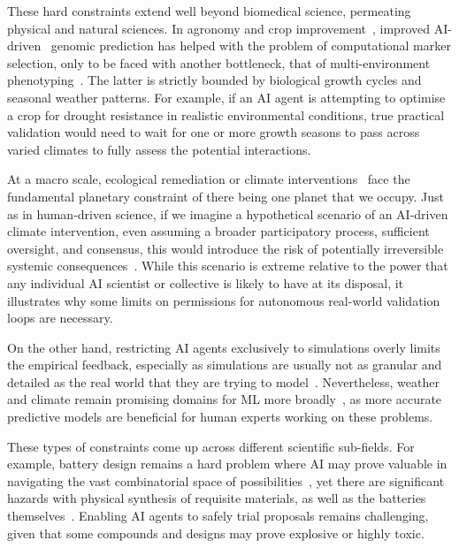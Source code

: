 \documentclass[11pt, a4paper, twocolumn, goog]{google}
\begin{document}
These hard constraints extend well beyond biomedical science, permeating physical and natural sciences. In agronomy and crop improvement~\citep{kumar2024advances}, improved AI-driven~\citep{feng2024ai, wojcik2024harnessing} genomic prediction has helped with the problem of computational marker selection, only to be faced with another bottleneck, that of multi-environment phenotyping~\citep{araus2018translating}. The latter is strictly bounded by biological growth cycles and seasonal weather patterns. For example, if an AI agent is attempting to optimise a crop for drought resistance in realistic environmental conditions, true practical validation would need to wait for one or more growth seasons to pass across varied climates to fully assess the potential interactions.

At a macro scale, ecological remediation or climate interventions~\citep{keith2013case} face the fundamental planetary constraint of there being one planet that we occupy. Just as in human-driven science, if we imagine a hypothetical scenario of an AI-driven climate intervention, even assuming a broader participatory process, sufficient oversight, and consensus, this would introduce the risk of potentially irreversible systemic consequences~\citep{hegerl2009risks, hulme2014can}. While this scenario is extreme relative to the power that any individual AI scientist or collective is likely to have at its disposal, it illustrates why some limits on permissions for autonomous real-world validation loops are necessary.

On the other hand, restricting AI agents exclusively to simulations overly limits the empirical feedback, especially as simulations are usually not as granular and detailed as the real world that they are trying to model~\citep{smith2002accurate, alizadeh2022advances}. Nevertheless, weather and climate remain promising domains for ML more broadly~\citep{bracco2025machine, zhang2025machine, price2025probabilistic}, as more accurate predictive models are beneficial for human experts working on these problems.

These types of constraints come up across different scientific sub-fields. For example, battery design remains a hard problem where AI may prove valuable in navigating the vast combinatorial space of possibilities~\citep{ramesh2023artificial, nair2025role, wang2026ai}, yet there are significant hazards with physical synthesis of requisite materials, as well as the batteries themselves~\citep{jeevarajan2022battery, ye2024development}. Enabling AI agents to safely trial proposals remains challenging, given that some compounds and designs may prove explosive or highly toxic.
\end{document}
